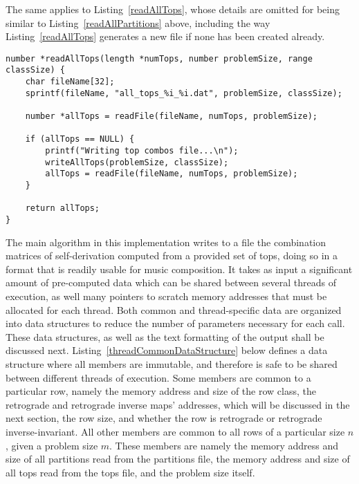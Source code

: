 The same applies to Listing~\ref{readAllTops}, whose details are omitted for being similar to Listing~\ref{readAllPartitions} above, including the way Listing~\ref{readAllTops} generates a new file if none has been created already.

\begin{lstlisting}[caption={Reading all tops from a file.},label={readAllTops}]
number *readAllTops(length *numTops, number problemSize, range classSize) {
    char fileName[32];
    sprintf(fileName, "all_tops_%i_%i.dat", problemSize, classSize);

    number *allTops = readFile(fileName, numTops, problemSize);

    if (allTops == NULL) {
        printf("Writing top combos file...\n");
        writeAllTops(problemSize, classSize);
        allTops = readFile(fileName, numTops, problemSize);
    }

    return allTops;
}
\end{lstlisting}

The main algorithm in this implementation writes to a file the combination matrices of self-derivation computed from a provided set of tops, doing so in a format that is readily usable for music composition. It takes as input a significant amount of pre-computed data which can be shared between several threads of execution, as well many pointers to scratch memory addresses that must be allocated for each thread. Both common and thread-specific data are organized into data structures to reduce the number of parameters necessary for each call. These data structures, as well as the text formatting of the output shall be discussed next. Listing~\ref{threadCommonDataStructure} below defines a data structure where all members are immutable, and therefore is safe to be shared between different threads of execution. Some members are common to a particular row, namely the memory address and size of the row class, the retrograde and retrograde inverse maps' addresses, which will be discussed in the next section, the row size, and whether the row is retrograde or retrograde inverse-invariant. All other members are common to all rows of a particular size $n$, given a problem size $m$. These members are namely the memory address and size of all partitions read from the partitions file, the memory address and size of all tops read from the tops file, and the problem size itself.

